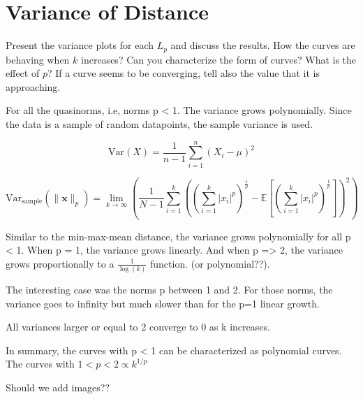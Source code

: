 
\section{Variance of Distance}
Present the variance plots for each \( L_p \) and discuss the results. How the curves are behaving when \( k \) increases? Can you characterize the form of curves? What is the effect of \( p \)? If a curve seems to be converging, tell also the value that it is approaching.



For all the quasinorms, i.e, norms p < 1. The variance grows polynomially. Since the data is a sample of random datapoints, the sample variance is used.

\[
    \text{Var}(X) = \frac{1}{n -1 } \sum_{i=1}^{n} \left(X_i - \mu \right)^2
\]


\begin{equation}
    \text{Var}_{\text{sample}}\left(\|\mathbf{x}\|_p\right) = \lim_{k \to \infty} \left( \frac{1}{N - 1} \sum_{i=1}^{k} \left( \left( \sum_{i=1}^{k} |x_i|^p \right)^{\frac{1}{p}} - \mathbb{E}\left[\left( \sum_{i=1}^{k} |x_i|^p \right)^{\frac{1}{p}}\right] \right)^2 \right)
\end{equation}

Similar to the min-max-mean distance, the variance grows polynomially for all p < 1. When p = 1, the variance grows linearly. And when p => 2, the variance grows proportionally to a \(\frac{1}{\log(k)}\) function. (or polynomial??).

The interesting case was the norms p between 1 and 2. For those norms, the variance goes to infinity but much slower than for the p=1 linear growth.

All variances larger or equal to 2 converge to 0 as k increases.

In summary, the curves with p < 1 can be characterized as polynomial curves. The curves with $ 1 < p < 2 \propto k^{1/p}$

Should we add images??
